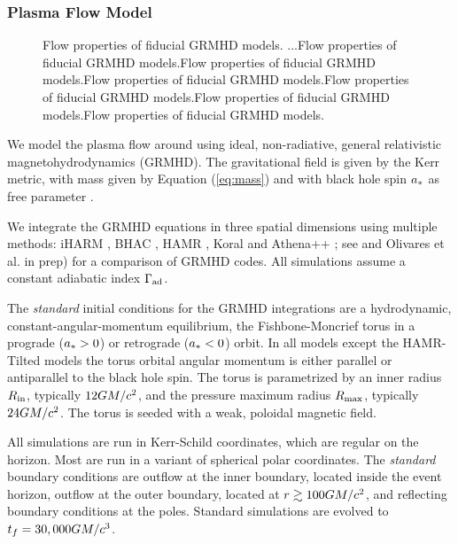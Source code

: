 \subsubsection{Plasma Flow Model}

\begin{figure}
  \caption{Flow properties of fiducial GRMHD models.
    ...Flow properties of fiducial GRMHD models.Flow properties of fiducial GRMHD models.Flow properties of fiducial GRMHD models.Flow properties of fiducial GRMHD models.Flow properties of fiducial GRMHD models.Flow properties of fiducial GRMHD models.}
  \label{fig:GRMHD}
\end{figure}

We model the plasma flow around \sgra using ideal, non-radiative, general relativistic magnetohydrodynamics (GRMHD).  The gravitational field is given by the Kerr metric, with mass given by Equation (\ref{eq:mass}) and with black hole spin $a_*$ as free parameter \citep[see e.g.,][]{2003ApJ...589..444G, 2005ApJ...635..723A, 2007A&A...473...11D}.

We integrate the GRMHD equations in three spatial dimensions using multiple methods: iHARM \citep{2021JOSS....6.3336P}, BHAC \citep{2017ComAC...4....1P}, HAMR \citep{2018MNRAS.474L..81L}, Koral \citep{2013MNRAS.429.3533S} and Athena++ \citep{2016ApJS..225...22W}; see \citealt{2019ApJS..243...26P} and Olivares et al. in prep) for a comparison of GRMHD codes.  All simulations assume a constant adiabatic index $\Gamma_{\rm ad}$.

The {\em standard} initial conditions for the GRMHD integrations are a hydrodynamic, constant-angular-momentum equilibrium, the Fishbone-Moncrief torus \citep{1976ApJ...207..962F} in a prograde ($a_* > 0$) or retrograde ($a_* < 0$) orbit.  In all models except the HAMR-Tilted models the torus orbital angular momentum is either parallel or antiparallel to the black hole spin. The torus is parametrized by an inner radius $R_{\rm in}$, typically $12GM/c^2$, and the pressure maximum radius $R_{\rm max}$, typically $24GM/c^2$.
The torus is seeded with a weak, poloidal magnetic field.

All simulations are run in Kerr-Schild coordinates, which are regular on the horizon.  Most are run in a variant of spherical polar coordinates.  The {\em standard} boundary conditions are outflow at the inner boundary, located inside the event horizon, outflow at the outer boundary, located at $r \gtrsim 100 GM/c^2$, and reflecting boundary conditions at the poles.  Standard  simulations are evolved to $t_f=30,000 GM/c^3$.

